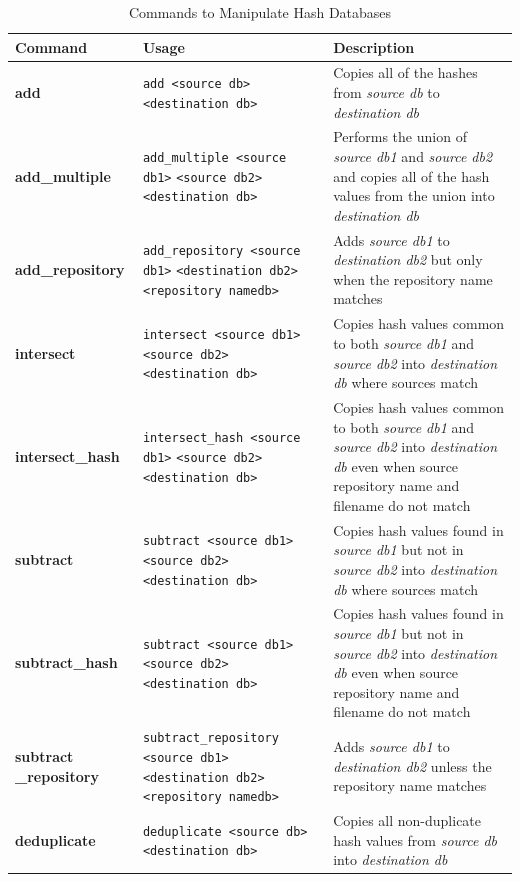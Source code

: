 \documentclass[11pt,fleqn]{article} %
\begin{document}
\begin{table}[!ht]
\centering
\caption{Commands to Manipulate Hash Databases}
\label{tab:databaseManipulation}
\begin{tabular}{|p{3.5 cm}|p{6 cm}|p{4 cm}|}
\hline \hline
\textbf{Command} & \textbf{Usage} & \textbf{Description} \\
\hline
\textbf{add} & \verb+add <source db>+ \verb+<destination db>+ & Copies all of the hashes from \textit{source db} to \textit{destination db}\\
\hline
\textbf{add\_multiple} &  \verb+add_multiple <source db1>+ \verb+<source db2> <destination db>+ & Performs the union of \textit{source db1} and \textit{source db2} and copies all of the hash values from the union into \textit{destination db}\\
\hline
\textbf{add\_repository} & \verb+add_repository <source db1>+ \verb+<destination db2>+ \verb+<repository namedb>+ & Adds \textit{source db1} to \textit{destination db2} but only when the repository name matches\\
\hline
\textbf{intersect} & \verb+intersect <source db1>+ \verb+<source db2> <destination db>+ &   Copies hash values common to both \textit{source db1} and \textit{source db2} into \textit{destination db} where sources match\\
\hline
\textbf{intersect\_hash} & \verb+intersect_hash <source db1>+ \verb+<source db2> <destination db>+ &   Copies hash values common to both \textit{source db1} and \textit{source db2} into \textit{destination db} even when source repository name and filename do not match\\
\hline
\textbf{subtract} & \verb+subtract <source db1>+ \verb+<source db2> <destination db>+&   Copies hash values found in \textit{source db1} but not in \textit{source db2} into \textit{destination db} where sources match\\
\hline
\textbf{subtract\_hash} & \verb+subtract <source db1>+ \verb+<source db2> <destination db>+&   Copies hash values found in \textit{source db1} but not in \textit{source db2} into \textit{destination db} even when source repository name and filename do not match\\
\hline
\textbf{subtract \_repository} & \verb+subtract_repository+ \verb+<source db1>+ \verb+<destination db2>+ \verb+<repository namedb>+ & Adds \textit{source db1} to \textit{destination db2} unless the repository name matches\\
\hline
\textbf{deduplicate} & \verb+deduplicate <source db>+ \verb+<destination db>+ &   Copies all non-duplicate hash values from \textit{source db} into \textit{destination db}\\
\hline
\end{tabular}
\end{table}
\end{document}
